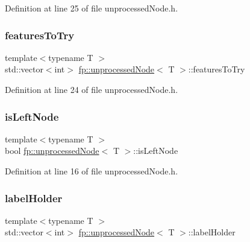 Definition at line 25 of file unprocessed\+Node.\+h.

\mbox{\label{classfp_1_1unprocessedNode_a3cffd07402568c03834d0a1248f3a6e3}} 
\subsubsection{\texorpdfstring{features\+To\+Try}{featuresToTry}}
{\footnotesize\ttfamily template$<$typename T $>$ \\
std\+::vector$<$int$>$ \hyperlink{classfp_1_1unprocessedNode}{fp\+::unprocessed\+Node}$<$ T $>$\+::features\+To\+Try\hspace{0.3cm}{\ttfamily [protected]}}



Definition at line 24 of file unprocessed\+Node.\+h.

\mbox{\label{classfp_1_1unprocessedNode_a81b74c36ed1ac15d367e135e2fa0ba3d}} 
\subsubsection{\texorpdfstring{is\+Left\+Node}{isLeftNode}}
{\footnotesize\ttfamily template$<$typename T $>$ \\
bool \hyperlink{classfp_1_1unprocessedNode}{fp\+::unprocessed\+Node}$<$ T $>$\+::is\+Left\+Node\hspace{0.3cm}{\ttfamily [protected]}}



Definition at line 16 of file unprocessed\+Node.\+h.

\mbox{\label{classfp_1_1unprocessedNode_a99524f9266d6fcf979f15ef445e629ca}} 
\subsubsection{\texorpdfstring{label\+Holder}{labelHolder}}
{\footnotesize\ttfamily template$<$typename T $>$ \\
std\+::vector$<$int$>$ \hyperlink{classfp_1_1unprocessedNode}{fp\+::unprocessed\+Node}$<$ T $>$\+::label\+Holder\hspace{0.3cm}{\ttfamily [protected]}}



